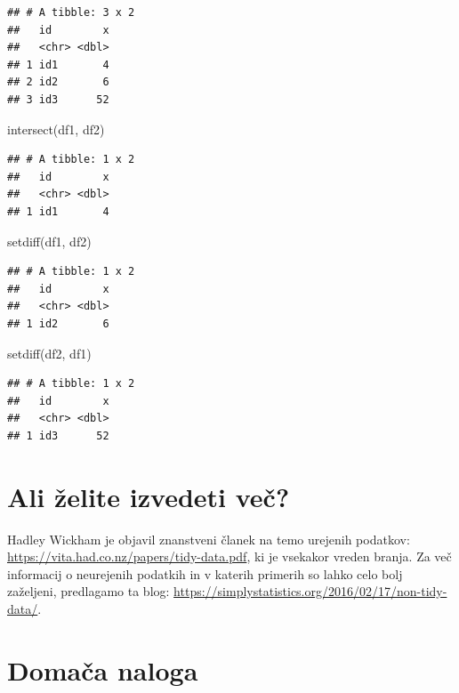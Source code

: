\documentclass[
]{book}
\newenvironment{Shaded}{\begin{snugshade}}{\end{snugshade}}
\newcommand{\FunctionTok}[1]{\textcolor[rgb]{0.00,0.00,0.00}{#1}}
\newcommand{\NormalTok}[1]{#1}
\begin{document}
\begin{verbatim}
## # A tibble: 3 x 2
##   id        x
##   <chr> <dbl>
## 1 id1       4
## 2 id2       6
## 3 id3      52
\end{verbatim}

\begin{Shaded}
\begin{Highlighting}[]
\FunctionTok{intersect}\NormalTok{(df1, df2)}
\end{Highlighting}
\end{Shaded}

\begin{verbatim}
## # A tibble: 1 x 2
##   id        x
##   <chr> <dbl>
## 1 id1       4
\end{verbatim}

\begin{Shaded}
\begin{Highlighting}[]
\FunctionTok{setdiff}\NormalTok{(df1, df2)}
\end{Highlighting}
\end{Shaded}

\begin{verbatim}
## # A tibble: 1 x 2
##   id        x
##   <chr> <dbl>
## 1 id2       6
\end{verbatim}

\begin{Shaded}
\begin{Highlighting}[]
\FunctionTok{setdiff}\NormalTok{(df2, df1)}
\end{Highlighting}
\end{Shaded}

\begin{verbatim}
## # A tibble: 1 x 2
##   id        x
##   <chr> <dbl>
## 1 id3      52
\end{verbatim}

\hypertarget{ali-ux17eelite-izvedeti-veux10d-1}{%
\section{Ali želite izvedeti več?}\label{ali-ux17eelite-izvedeti-veux10d-1}}

Hadley Wickham je objavil znanstveni članek na temo urejenih podatkov: \url{https://vita.had.co.nz/papers/tidy-data.pdf}, ki je vsekakor vreden branja. Za več informacij o neurejenih podatkih in v katerih primerih so lahko celo bolj zaželjeni, predlagamo ta blog: \url{https://simplystatistics.org/2016/02/17/non-tidy-data/}.

\hypertarget{domaux10da-naloga-1}{%
\section{Domača naloga}\label{domaux10da-naloga-1}}
\end{document}
